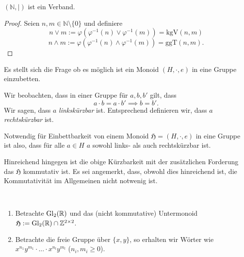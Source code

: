 \begin{corollary}
    $(\mathbb{N}, \mid)$ ist ein Verband.
\end{corollary}

\begin{proof}
    Seien $n,m \in \mathbb{N} \setminus \{0\}$ und definiere
    $$ n \vee m := \varphi(\varphi^{-1}(n) \vee \varphi^{-1}(m)) = \textrm{kgV}(n,m) $$
    $$ n \wedge m := \varphi(\varphi^{-1}(n) \wedge \varphi^{-1}(m)) = \textrm{ggT}(n,m). $$
\end{proof}

\begin{remark}
    Es stellt sich die Frage ob es möglich ist ein Monoid $(H, \cdot, e)$ in eine Gruppe einzubetten.

    Wir beobachten, dass in einer Gruppe für $a, b, b'$ gilt, dass
    $$ a \cdot b = a \cdot b' \implies b = b'. $$
    Wir sagen, dass $a$ \emph{linkskürzbar} ist. Entsprechend definieren wir, dass $a$ \emph{rechtskürzbar} ist. 

    Notwendig für Einbettbarkeit von einem Monoid $\mathfrak{H} = (H, \cdot, e)$ in eine Gruppe ist also, dass für alle $a \in H$ $a$ sowohl links- als auch rechtskürzbar ist.

    Hinreichend hingegen ist die obige Kürzbarkeit mit der zusätzlichen Forderung das $\mathfrak{H}$ kommutativ ist. Es sei angemerkt, dass, obwohl dies hinreichend ist, die Kommutativität im Allgemeinen nicht notwenig ist.
\end{remark}

\begin{example} {\ }
    \begin{enumerate}
        \item Betrachte $\operatorname{Gl}_2(\mathbb{R})$ und das (nicht kommutative) Untermonoid $\mathfrak{H} := \operatorname{Gl}_2(\mathbb{R}) \cap \mathbb{Z}^{2 \times 2}$.
        \item Betrachte die freie Gruppe über $\{x,y\}$, so erhalten wir Wörter wie $x^{n_1} y^{m_1} \cdot ... \cdot x^{n_l} y^{m_l}$ ($n_i, m_i \geq 0$).
    \end{enumerate}
\end{example}


